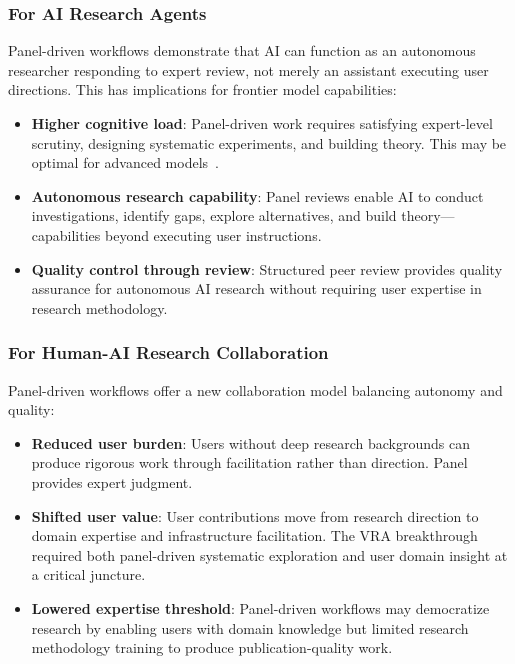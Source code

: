 \subsubsection{For AI Research Agents}

Panel-driven workflows demonstrate that AI can function as an autonomous researcher responding to expert review, not merely an assistant executing user directions. This has implications for frontier model capabilities:

\begin{itemize}[leftmargin=*]
\item \textbf{Higher cognitive load}: Panel-driven work requires satisfying expert-level scrutiny, designing systematic experiments, and building theory. This may be optimal for advanced models~\cite{anthropic2025sonnet45}.

\item \textbf{Autonomous research capability}: Panel reviews enable AI to conduct investigations, identify gaps, explore alternatives, and build theory---capabilities beyond executing user instructions.

\item \textbf{Quality control through review}: Structured peer review provides quality assurance for autonomous AI research without requiring user expertise in research methodology.
\end{itemize}

\subsubsection{For Human-AI Research Collaboration}

Panel-driven workflows offer a new collaboration model balancing autonomy and quality:

\begin{itemize}[leftmargin=*]
\item \textbf{Reduced user burden}: Users without deep research backgrounds can produce rigorous work through facilitation rather than direction. Panel provides expert judgment.

\item \textbf{Shifted user value}: User contributions move from research direction to domain expertise and infrastructure facilitation. The VRA breakthrough required both panel-driven systematic exploration and user domain insight at a critical juncture.

\item \textbf{Lowered expertise threshold}: Panel-driven workflows may democratize research by enabling users with domain knowledge but limited research methodology training to produce publication-quality work.
\end{itemize}

